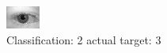 \begin{figure}[h!]
\begin{center}
\includegraphics[width=0.60\columnwidth]{figures/ID533_class_2_target_3.png}
\end{center}
\caption{ Classification: 2 actual target: 3}
\label{fig:ID533_class_2_target_3}
\end{figure}
